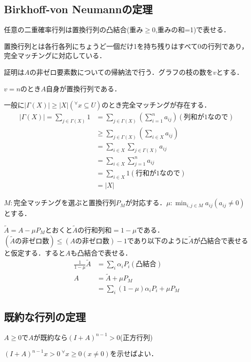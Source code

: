 \subsection{Birkhoff-von Neumannの定理}
\begin{thm}
  任意の二重確率行列は置換行列の凸結合(重み$\geq 0$,重みの和=1)で表せる．
\end{thm}
置換行列とは各行各列にちょうど一個だけ1を持ち残りはすべて0の行列であり，完全マッチングに対応している．

証明は$A$の非ゼロ要素数についての帰納法で行う．グラフの枝の数を$v$とする．

$v=n$のとき$A$自身が置換行列である．

一般に$|\Gamma (X)|\geq |X|({}^{\forall}x\subseteq U)$のとき完全マッチングが存在する．
\begin{align*}
  |\Gamma (X)|=\displaystyle\sum_{j\in \Gamma (X)}1&=\sum_{j\in\Gamma (X)}(\sum_{i=1}^n a_{ij})(列和が1なので)\\
  &\geq \displaystyle\sum_{j\in\Gamma (X)}(\sum_{i\in X}a_{ij})\\
  &=\displaystyle\sum_{i\in X}\sum_{j\in\Gamma (X)}a_{ij}\\
  &=\displaystyle\sum_{i\in X}\sum_{j=1}^n a_{ij}\\
  &=\displaystyle\sum_{i\in X}1(行和が1なので)\\
  &=|X|
\end{align*}

$M:$完全マッチングを選ぶと置換行列$P_M$が対応する．$\mu :\min_{i,j\in M}a_{ij}(a_{ij}\neq 0)$とする．

$\tilde{A}=A-\mu P_M とおくと\tilde{A}の行和列和=1-\mu$である．$(\tilde{A}の非ゼロ数)\leq (Aの非ゼロ数)-1$であり以下のように$\tilde{A}$が凸結合で表せると仮定する．すると$A$も凸結合で表せる．
\begin{align*}
  \displaystyle\frac{1}{1-\mu}\tilde{A}&=\sum_{i}{\alpha}_i P_i (凸結合)\\
  A&=\tilde{A}+\mu P_M\\
  &=\displaystyle\sum_i (1-\mu ){\alpha}_i P_i +\mu P_M
\end{align*}
\subsection{既約な行列の定理}
\begin{thm}
  $A\geq 0$で$A$が既約なら${(I+A)}^{n-1}>0$(正方行列)
\end{thm}

${(I+A)}^{n-1}x>0\ {}^{\forall}x\geq 0(x\neq 0)を示せばよい．$

